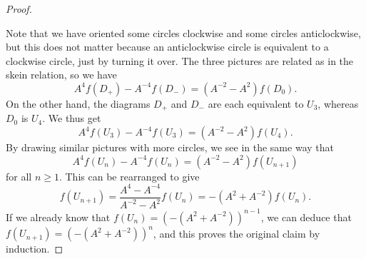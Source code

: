 \documentclass[reqno]{amsart}
\theoremstyle{definition}
\begin{document}
\begin{proof}
\begin{center}
 \end{center}
 Note that we have oriented some circles clockwise and some circles
 anticlockwise, but this does not matter because an anticlockwise
 circle is equivalent to a clockwise circle, just by turning it over.
 The three pictures are related as in the skein relation, so we have 
 \[ A^4 f(D_+) - A^{-4} f(D_-) = (A^{-2}-A^2) f(D_0). \]
 On the other hand, the diagrams $D_+$ and $D_-$ are each equivalent
 to $U_3$, whereas $D_0$ is $U_4$.  We thus get 
 \[ A^4 f(U_3) - A^{-4} f(U_3) = (A^{-2}-A^2) f(U_4). \]
 By drawing similar pictures with more circles, we see in the same way
 that 
 \[ A^4 f(U_n) - A^{-4} f(U_n) = (A^{-2}-A^2) f(U_{n+1}) \]
 for all $n\geq 1$.  This can be rearranged to give 
 \[ f(U_{n+1}) = \frac{A^4-A^{-4}}{A^{-2}-A^2} f(U_n) 
               = - (A^2+A^{-2}) f(U_n).
 \]
 If we already know that $f(U_n)=(-(A^2+A^{-2}))^{n-1}$, we can deduce
 that $f(U_{n+1})=(-(A^2+A^{-2}))^n$, and this proves the original
 claim by induction.
\end{proof}
\end{document}
